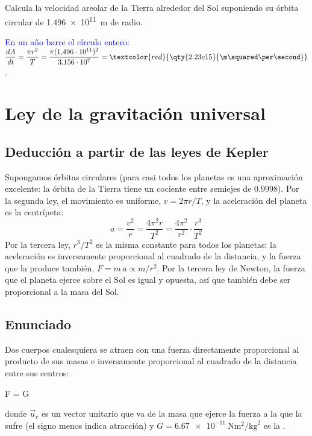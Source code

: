 \begin{exercise}
    Calcula la velocidad areolar de la Tierra alrededor del Sol suponiendo su órbita circular de \qty{1.496e11}{\m} de radio.
    \begin{solu}
        \textcolor{blue}{En un año barre el círculo entero:}
        \(\dfrac{dA}{dt} = \dfrac{\pi r^2}{T} = \dfrac{\pi (1{,}496\cdot 10^{11})^2}{3{,}156\cdot 10^7} = \textcolor{red}{\qty{2.23e15}{\m\squared\per\second}}\).
    \end{solu}
\end{exercise}

\section{Ley de la gravitación universal}\label{sec:grav-newton}

\subsection{Deducción a partir de las leyes de Kepler}\label{subsec:grav-deduccion}

Supongamos órbitas circulares (para casi todos los planetas es una aproximación excelente: la órbita de la Tierra tiene un
cociente entre semiejes de \num{0.9998}). Por la segunda ley, el movimiento es uniforme, \(v = 2\pi r/T\), y la aceleración
del planeta es la centrípeta:
\begin{equation*}
    a = \dfrac{v^2}{r} = \dfrac{4\pi^2 r}{T^2} = \dfrac{4\pi^2}{r^2}\cdot\dfrac{r^3}{T^2}
\end{equation*}
Por la tercera ley, \(r^3/T^2\) es la misma constante para todos los planetas: la aceleración es inversamente proporcional al
cuadrado de la distancia, y la fuerza que la produce también, \(F = m\,a \propto m/r^2\). Por la tercera ley de Newton, la
fuerza que el planeta ejerce sobre el Sol es igual y opuesta, así que también debe ser proporcional a la masa del Sol.

\subsection{Enunciado}\label{subsec:grav-enunciado}

\begin{definition}
    Dos cuerpos cualesquiera se atraen con una fuerza directamente proporcional al producto de sus masas e inversamente
    proporcional al cuadrado de la distancia entre sus centros:
    \begin{centeredequation}
         \qquad\qquad F = G\, \label{eq:grav-newton}
    \end{centeredequation}
    donde \(\vec u_r\) es un vector unitario que va de la masa que ejerce la fuerza a la que la sufre (el signo menos indica
    atracción) y \(G = \qty{6.67e-11}{\newton\m\squared\per\kg\squared}\) es la .
\end{definition}

